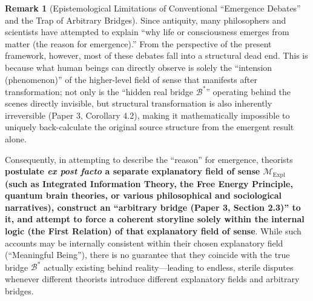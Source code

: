 \documentclass[11pt,a4paper]{article}
\theoremstyle{definition}
\newtheorem{remark}{Remark}[section]
\theoremstyle{plain}
\begin{document}
\begin{remark}[Epistemological Limitations of Conventional ``Emergence Debates'' and the Trap of Arbitrary Bridges]
Since antiquity, many philosophers and scientists have attempted to explain ``why life or consciousness emerges from matter (the reason for emergence).'' From the perspective of the present framework, however, most of these debates fall into a structural dead end. This is because what human beings can directly observe is solely the ``intension (phenomenon)'' of the higher-level field of sense that manifests after transformation; not only is the ``hidden real bridge $\mathcal{B}^*$'' operating behind the scenes directly invisible, but structural transformation is also inherently irreversible (Paper 3, Corollary 4.2), making it mathematically impossible to uniquely back-calculate the original source structure from the emergent result alone.

Consequently, in attempting to describe the ``reason'' for emergence, theorists \textbf{postulate \textit{ex post facto} a separate explanatory field of sense $\mathcal{M}_{\mathrm{Expl}}$ (such as Integrated Information Theory, the Free Energy Principle, quantum brain theories, or various philosophical and sociological narratives), construct an ``arbitrary bridge (Paper 3, Section 2.3)'' to it, and attempt to force a coherent storyline solely within the internal logic (the First Relation) of that explanatory field of sense}. While such accounts may be internally consistent within their chosen explanatory field (``Meaningful Being''), there is no guarantee that they coincide with the true bridge $\mathcal{B}^*$ actually existing behind reality---leading to endless, sterile disputes whenever different theorists introduce different explanatory fields and arbitrary bridges.
\end{remark}
\end{document}
